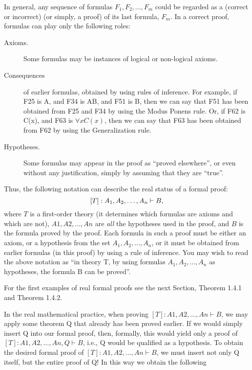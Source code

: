 In general, any sequence of formulas \(F_1, F_2, \ldots , F_m\) could be regarded as a (correct or incorrect)  (or simply, a proof) of its last formula, \(F_m\).
In a correct proof, formulas can play only the following roles:

\begin{description}
    \item[Axioms.] Some formulas may be instances of logical or non-logical axioms.
    \item[Consequences] of earlier formulas, obtained by using rules of inference. For example, if F25 is A, and F34 is A\IMPLIES B, and F51 is B, then we can say that F51 has been obtained from F25 and F34 by using the Modus Ponens rule. Or, if F62 is C(x), and F63 is \(\forall xC(x)\), then we can say that F63 has been obtained from F62 by using the Generalization rule.
    \item[Hypotheses.] Some formulas may appear in the proof as ``proved elsewhere'', or even without any justification, simply by assuming that they are ``true''.
\end{description}

Thus, the following notation can describe the real status of a formal proof:
\[
[T]: A_1, A_2, \ldots , A_n\vdash B,
\]
where \(T\) is a first-order theory (it determines which formulas are axioms and which are not), \(A1, A2, \ldots , An\) are \emph{all} the hypotheses used in the proof, and \(B\) is the formula proved by the proof.
Each formula in such a proof must be either an axiom, or a hypothesis from the set \(A_1, A_2, \ldots , A_n\), or it must be obtained from earlier formulas (in this proof) by using a rule of inference.
You may wish to read the above notation as ``in theory T, by using formulas \(A_1, A_2, \ldots , A_n\) as hypotheses, the formula B can be proved''.

For the first examples of real formal proofs see the next Section, Theorem 1.4.1 and Theorem 1.4.2.

In the real mathematical practice, when proving \([T]: A1, A2, \ldots , An \vdash B\), we may apply some theorem Q that already has been proved earlier. If we would simply insert Q into our formal proof, then, formally,
this would yield only a proof of \([T]: A1, A2, \ldots , An, Q \vdash B\), i.e., Q would be qualified as a hypothesis. To
obtain the desired formal proof of \([T]: A1, A2, \ldots , An \vdash B\), we must insert not only Q itself, but the entire
proof of Q! In this way we obtain the following

